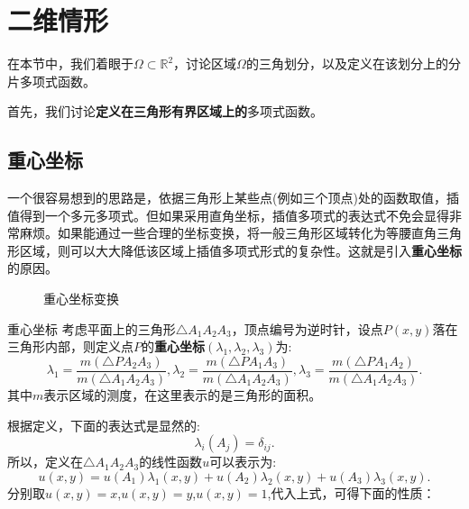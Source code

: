 \section{二维情形}
在本节中，我们着眼于$\Omega\subset\mathbb{R}^{2}$，讨论区域$\Omega$的三角划分，以及定义在该划分上的分片多项式函数。

首先，我们讨论\textbf{定义在三角形有界区域上的}多项式函数。
\subsection{重心坐标}
一个很容易想到的思路是，依据三角形上某些点(例如三个顶点)处的函数取值，插值得到一个多元多项式。但如果采用直角坐标，插值多项式的表达式不免会显得非常麻烦。如果能通过一些合理的坐标变换，将一般三角形区域转化为等腰直角三角形区域，则可以大大降低该区域上插值多项式形式的复杂性。这就是引入\textbf{重心坐标}的原因。
\begin{figure}[H]
    \caption{重心坐标变换}
        \centering
\end{figure}
\begin{definition}{重心坐标}
    考虑平面上的三角形$\triangle A_{1}A_{2}A_{3}$，顶点编号为逆时针，设点$P(x,y)$落在三角形内部，则定义点$P$的\textbf{重心坐标}$(\lambda_{1},\lambda_{2},\lambda_{3})$为:
    \begin{equation}
        \lambda_{1}=\frac{m(\triangle PA_{2}A_{3})}{m(\triangle A_{1}A_{2}A_{3})},\lambda_{2}=\frac{m(\triangle PA_{1}A_{3})}{m(\triangle A_{1}A_{2}A_{3})},\lambda_{3}=\frac{m(\triangle PA_{1}A_{2})}{m(\triangle A_{1}A_{2}A_{3})}.
    \end{equation}
    其中$m$表示区域的测度，在这里表示的是三角形的面积。
\end{definition}
根据定义，下面的表达式是显然的:
\begin{equation}
    \label{eq:burycenterCoordProp}
    \lambda_{i}(A_{j})=\delta_{ij}.
\end{equation}
所以，定义在$\triangle A_{1}A_{2}A_{3}$的线性函数$u$可以表示为:
\begin{equation}
    u(x,y)=u(A_{1})\lambda_{1}(x,y)+u(A_{2})\lambda_{2}(x,y)+u(A_{3})\lambda_{3}(x,y).
\end{equation}
分别取$u(x,y)=x$,$u(x,y)=y$,$u(x,y)=1$,代入上式，可得下面的性质：
